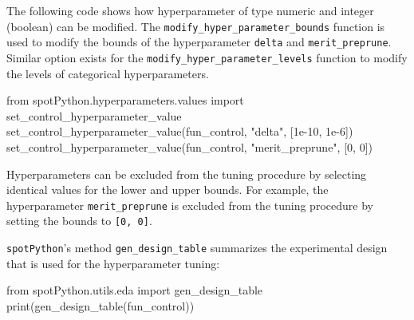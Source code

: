 \documentclass[
  letterpaper,
  DIV=11,
  numbers=noendperiod]{scrreprt}
\newenvironment{Shaded}{\begin{snugshade}}{\end{snugshade}}
\newcommand{\BuiltInTok}[1]{\textcolor[rgb]{0.00,0.23,0.31}{#1}}
\newcommand{\DecValTok}[1]{\textcolor[rgb]{0.68,0.00,0.00}{#1}}
\newcommand{\FloatTok}[1]{\textcolor[rgb]{0.68,0.00,0.00}{#1}}
\newcommand{\ImportTok}[1]{\textcolor[rgb]{0.00,0.46,0.62}{#1}}
\newcommand{\NormalTok}[1]{\textcolor[rgb]{0.00,0.23,0.31}{#1}}
\newcommand{\StringTok}[1]{\textcolor[rgb]{0.13,0.47,0.30}{#1}}
\begin{document}
The following code shows how hyperparameter of type numeric and integer
(boolean) can be modified. The \texttt{modify\_hyper\_parameter\_bounds}
function is used to modify the bounds of the hyperparameter
\texttt{delta} and \texttt{merit\_preprune}. Similar option exists for
the \texttt{modify\_hyper\_parameter\_levels} function to modify the
levels of categorical hyperparameters.

\begin{Shaded}
\begin{Highlighting}[]
\ImportTok{from}\NormalTok{ spotPython.hyperparameters.values }\ImportTok{import}\NormalTok{ set\_control\_hyperparameter\_value}
\NormalTok{set\_control\_hyperparameter\_value(fun\_control, }\StringTok{"delta"}\NormalTok{, [}\FloatTok{1e{-}10}\NormalTok{, }\FloatTok{1e{-}6}\NormalTok{])}
\NormalTok{set\_control\_hyperparameter\_value(fun\_control, }\StringTok{"merit\_preprune"}\NormalTok{, [}\DecValTok{0}\NormalTok{, }\DecValTok{0}\NormalTok{])}
\end{Highlighting}
\end{Shaded}

\begin{tcolorbox}[enhanced jigsaw, coltitle=black, bottomrule=.15mm, breakable, toprule=.15mm, colframe=quarto-callout-note-color-frame, title=\textcolor{quarto-callout-note-color}{\faInfo}\hspace{0.5em}{Note: Active and Inactive Hyperparameters}, colbacktitle=quarto-callout-note-color!10!white, opacityback=0, left=2mm, leftrule=.75mm, colback=white, rightrule=.15mm, bottomtitle=1mm, toptitle=1mm, titlerule=0mm, arc=.35mm, opacitybacktitle=0.6]

Hyperparameters can be excluded from the tuning procedure by selecting
identical values for the lower and upper bounds. For example, the
hyperparameter \texttt{merit\_preprune} is excluded from the tuning
procedure by setting the bounds to \texttt{{[}0,\ 0{]}}.

\end{tcolorbox}

\texttt{spotPython}'s method \texttt{gen\_design\_table} summarizes the
experimental design that is used for the hyperparameter tuning:

\begin{Shaded}
\begin{Highlighting}[]
\ImportTok{from}\NormalTok{ spotPython.utils.eda }\ImportTok{import}\NormalTok{ gen\_design\_table}
\BuiltInTok{print}\NormalTok{(gen\_design\_table(fun\_control))}
\end{Highlighting}
\end{Shaded}
\end{document}
